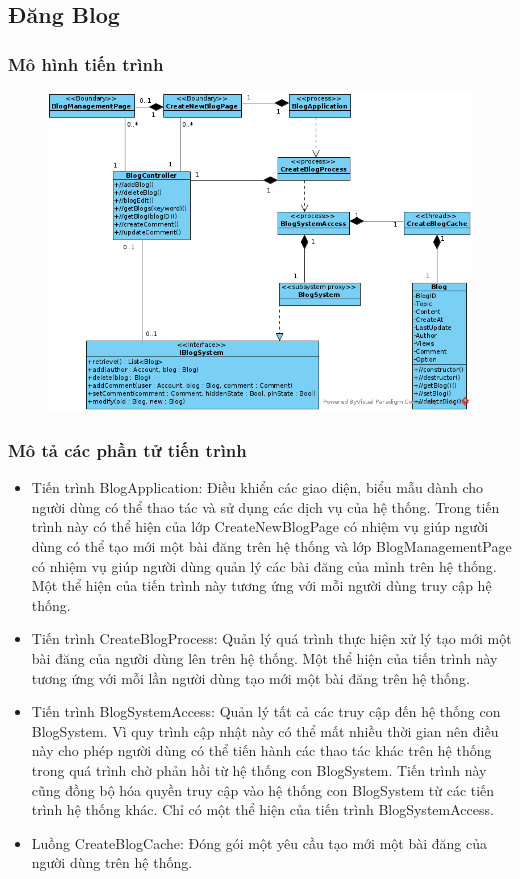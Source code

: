 \documentclass[./../main_file.tex]{subfiles}
\begin{document}
\subsection{Đăng Blog}

\subsubsection{Mô hình tiến trình}

\begin{figure}[H]
	\centering
	\includegraphics[width=\linewidth]{./images/pv_Blog.png}
\end{figure}

\subsubsection{Mô tả các phần tử tiến trình}
\begin{itemize}
	\item Tiến trình BlogApplication: Điều khiển các giao diện, biểu mẫu dành cho người dùng có thể thao tác và sử dụng các dịch vụ của hệ thống. Trong tiến trình này có thể hiện của lớp CreateNewBlogPage có nhiệm vụ giúp người dùng có thể tạo mới một bài đăng trên hệ thống và lớp BlogManagementPage có nhiệm vụ giúp người dùng quản lý các bài đăng của mình trên hệ thống.
	      Một thể hiện của tiến trình này tương ứng với mỗi người dùng truy cập hệ thống.
	\item Tiến trình CreateBlogProcess: Quản lý quá trình thực hiện xử lý tạo mới một bài đăng của người dùng lên trên hệ thống.
	      Một thể hiện của tiến trình này tương ứng với mỗi lần người dùng tạo mới một bài đăng trên hệ thống.
	\item Tiến trình BlogSystemAccess: Quản lý tất cả các truy cập đến hệ thống con BlogSystem. Vì quy trình cập nhật này có thể mất nhiều thời gian nên điều này cho phép người dùng có thể tiến hành các thao tác khác trên hệ thống trong quá trình chờ phản hồi từ hệ thống con BlogSystem. Tiến trình này cũng đồng bộ hóa quyền truy cập vào hệ thống con BlogSystem từ các tiến trình hệ thống khác.
	      Chỉ có một thể hiện của tiến trình BlogSystemAccess.
	\item Luồng CreateBlogCache: Đóng gói một yêu cầu tạo mới một bài đăng của người dùng trên hệ thống.
\end{itemize}
\end{document}
